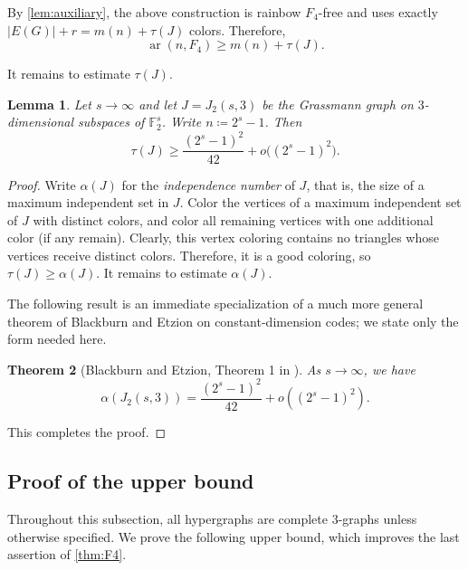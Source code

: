 \documentclass[10pt,a4paper]{article}
\newtheorem{theorem}{Theorem}[section]
\newtheorem{lemma}[theorem]{Lemma}
\theoremstyle{definition}
\newcommand{\FF}{\mathbb{F}}
\DeclareMathOperator{\ar}{ar}
\begin{document}
By \cref{lem:auxiliary}, the above construction is rainbow $F_4$-free and uses exactly $|E(G)|+r=m(n)+\tau(J)$ colors.
Therefore,
\begin{equation}\label{eq:ar-lower-by-tau}
    \ar(n,F_4)\ge m(n)+\tau(J).
\end{equation}

It remains to estimate $\tau(J)$.


\begin{lemma}\label{lem:tau_J23}
    Let $s\to\infty$ and let $J=J_2(s,3)$ be the Grassmann graph on $3$-dimensional subspaces of $\FF_2^s$.
    Write $n\coloneqq 2^s-1$.
    Then
    \[
        \tau(J)\ge\frac{(2^s-1)^2}{42}+o\bigl((2^s-1)^2\bigr).
    \]
\end{lemma}

\begin{proof}
    Write $\alpha(J)$ for the {\it independence number} of $J$, that is, the size of a maximum independent set in $J$.
    Color the vertices of a maximum independent set of $J$ with distinct colors, and color all remaining vertices with one additional color (if any remain).
    Clearly, this vertex coloring contains no triangles whose vertices receive distinct colors.
    Therefore, it is a good coloring, so $\tau(J)\ge \alpha(J)$.
    It remains to estimate $\alpha(J)$.

    The following result is an immediate specialization of a much more general theorem of Blackburn and Etzion on constant-dimension codes; we state only the form needed here.
    \begin{theorem}[Blackburn and Etzion, Theorem 1 in \cite{blackburn}]\label{thm:BE-special}
        As $s\to\infty$, we have
        \[
            \alpha(J_2(s,3))=\frac{(2^s-1)^2}{42}+o((2^s-1)^2).
        \]
    \end{theorem}
    This completes the proof.
\end{proof}

\subsection{Proof of the upper bound}

Throughout this subsection, all hypergraphs are complete $3$-graphs unless otherwise specified.
We prove the following upper bound, which improves the last assertion of \cref{thm:F4}.
\end{document}
